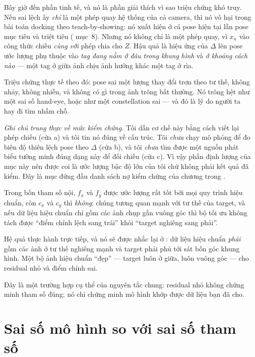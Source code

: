 \documentclass[../../marker.tex]{subfiles}
\begin{document}
Bây giờ đến phần tinh tế, và nó là phần giải thích vì sao triệu chứng khó truy. Nếu sai lệch ấy \emph{chỉ} là một phép quay hệ thống của cả camera, thì nó vô hại trong bài toán docking theo teach-by-showing: nó xuất hiện ở cả pose hiện tại lẫn pose mục tiêu và triệt tiêu ( mục~8). Nhưng nó không chỉ là một phép quay, vì \(x_n\) vào công thức chiếu \emph{cùng với} phép chia cho \(Z\). Hậu quả là hiệu ứng của \(\Delta\) lên pose ước lượng phụ thuộc vào \emph{tag đang nằm ở đâu trong khung hình} và \emph{ở khoảng cách nào} --- một tag ở giữa ảnh chịu ảnh hưởng khác một tag ở rìa.

Triệu chứng thực tế theo đó: pose sai một lượng thay đổi trơn theo tư thế, không nhảy, không nhiễu, và không có gì trong ảnh trông bất thường. Nó trông hệt như một sai số hand-eye, hoặc như một constellation sai --- và đó là lý do người ta hay đi tìm nhầm chỗ.

\emph{Ghi chú trung thực về mức kiểm chứng.} Tôi dẫn cơ chế này bằng cách viết lại phép chiếu (cửa a) và tôi tin nó đúng về cấu trúc. Tôi \emph{chưa} chạy mô phỏng để đo biên độ thiên lệch pose theo \(\Delta\) (cửa b), và tôi \emph{chưa} tìm được một nguồn phát biểu tường minh đúng dạng này để đối chiếu (cửa c). Vì vậy phần định lượng của mục này nên được coi là ước lượng bậc độ lớn của tôi chứ không phải kết quả đã kiểm. Đây là mục đứng đầu danh sách nợ kiểm chứng của chương trong .

\begin{cannho}
Trong bốn tham số nội, \(f_x\) và \(f_y\) được ước lượng rất tốt bởi mọi quy trình hiệu chuẩn, còn \(c_x\) và \(c_y\) thì \emph{không}: chúng tương quan mạnh với tư thế của target, và nếu dữ liệu hiệu chuẩn chỉ gồm các ảnh chụp gần vuông góc thì bộ tối ưu không tách được ``điểm chính lệch sang trái'' khỏi ``target nghiêng sang phải''.

Hệ quả thực hành trực tiếp, và nó sẽ được nhắc lại ở : dữ liệu hiệu chuẩn \emph{phải} gồm các ảnh ở tư thế nghiêng mạnh và target phải phủ tới sát bốn góc khung hình. Một bộ ảnh hiệu chuẩn ``đẹp'' --- target luôn ở giữa, luôn vuông góc --- cho residual nhỏ và điểm chính sai.

Đây là một trường hợp cụ thể của nguyên tắc chung: residual nhỏ không chứng minh tham số đúng; nó chỉ chứng minh mô hình khớp được dữ liệu bạn đã cho.
\end{cannho}

\section{Sai số mô hình so với sai số tham số}
\end{document}
